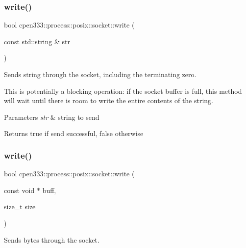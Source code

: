 \subsubsection{\texorpdfstring{write()}{write()}\hspace{0.1cm}{\footnotesize\ttfamily [1/2]}}
{\footnotesize\ttfamily bool cpen333\+::process\+::posix\+::socket\+::write (\begin{DoxyParamCaption}\item[{const std\+::string \&}]{str }\end{DoxyParamCaption})\hspace{0.3cm}{\ttfamily [inline]}}



Sends string through the socket, including the terminating zero. 

This is potentially a blocking operation\+: if the socket buffer is full, this method will wait until there is room to write the entire contents of the string.


\begin{DoxyParams}{Parameters}
{\em str} & string to send \\
\hline
\end{DoxyParams}
\begin{DoxyReturn}{Returns}
true if send successful, false otherwise 
\end{DoxyReturn}
\mbox{\label{classcpen333_1_1process_1_1posix_1_1socket_a60ba24c07c24cfb34ef77b0f137cfc32}} 
\subsubsection{\texorpdfstring{write()}{write()}\hspace{0.1cm}{\footnotesize\ttfamily [2/2]}}
{\footnotesize\ttfamily bool cpen333\+::process\+::posix\+::socket\+::write (\begin{DoxyParamCaption}\item[{const void $\ast$}]{buff,  }\item[{size\+\_\+t}]{size }\end{DoxyParamCaption})\hspace{0.3cm}{\ttfamily [inline]}}



Sends bytes through the socket. 

